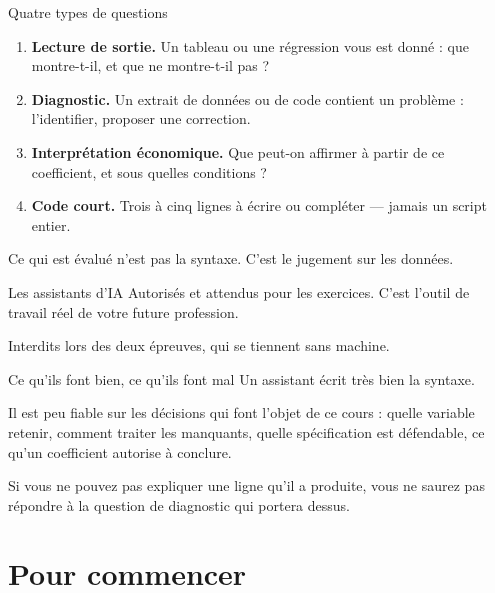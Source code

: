 \documentclass[10pt,aspectratio=169]{beamer}
\begin{document}
\begin{frame}{Quatre types de questions}
\begin{enumerate}
  \item \textbf{Lecture de sortie.} Un tableau ou une régression vous est donné : que montre-t-il, et que ne montre-t-il pas ?
  \item \textbf{Diagnostic.} Un extrait de données ou de code contient un problème : l'identifier, proposer une correction.
  \item \textbf{Interprétation économique.} Que peut-on affirmer à partir de ce coefficient, et sous quelles conditions ?
  \item \textbf{Code court.} Trois à cinq lignes à écrire ou compléter --- jamais un script entier.
\end{enumerate}
\vfill
Ce qui est évalué n'est pas la syntaxe. C'est le \alert{jugement sur les données}.
\end{frame}

\begin{frame}{Les assistants d'IA}
Autorisés et attendus pour les exercices. C'est l'outil de travail réel de votre future profession.

Interdits lors des deux épreuves, qui se tiennent sans machine.

\vspace{1.2em}
\begin{block}{Ce qu'ils font bien, ce qu'ils font mal}
Un assistant écrit très bien la syntaxe.

\vspace{0.4em}
Il est peu fiable sur les décisions qui font l'objet de ce cours : quelle variable retenir, comment traiter les manquants, quelle spécification est défendable, ce qu'un coefficient autorise à conclure.
\end{block}

\vspace{0.8em}
Si vous ne pouvez pas expliquer une ligne qu'il a produite, vous ne saurez pas répondre à la question de diagnostic qui portera dessus.
\end{frame}

\section{Pour commencer}
\end{document}
